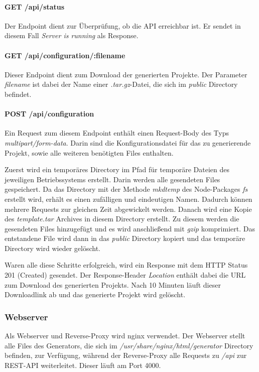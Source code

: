 \paragraph{GET /api/status}
Der Endpoint dient zur Überprüfung, ob die API erreichbar ist.
Er sendet in diesem Fall \textit{Server is running} als Response.

\paragraph{GET /api/configuration/:filename}
Dieser Endpoint dient zum Download der generierten Projekte.
Der Parameter \textit{filename} ist dabei der Name einer \textit{.tar.gz}-Datei, die sich im \textit{public}
Directory befindet.

\paragraph{POST /api/configuration}
Ein Request zum diesem Endpoint enthält einen Request-Body des Typs
\textit{multipart/form-data}.
Darin sind die Konfigurationsdatei für das zu generierende Projekt, sowie alle weiteren benötigten Files enthalten.

Zuerst wird ein temporäres Directory im Pfad für temporäre Dateien des jeweiligen Betriebssystems erstellt.
Darin werden alle gesendeten Files gespeichert.
Da das Directory mit der Methode \textit{mkdtemp} des Node-Packages \textit{fs} erstellt wird, erhält es einen
zufälligen und eindeutigen Namen.
Dadurch können mehrere Requests zur gleichen Zeit abgewickelt werden.
Danach wird eine Kopie des \textit{template.tar} Archives in diesem Directory erstellt.
Zu diesem werden die gesendeten Files hinzugefügt und es wird anschließend mit \textit{gzip} komprimiert.
Das entstandene File wird dann in das \textit{public} Directory kopiert und das temporäre Directory wird wieder gelöscht.

Waren alle diese Schritte erfolgreich, wird ein Response mit dem HTTP Status 201 (Created)
gesendet.
Der Response-Header \textit{Location} enthält dabei die URL zum Download des generierten Projekts.
Nach 10 Minuten läuft dieser Downloadlink ab und das generierte Projekt wird gelöscht.

\subsubsection{Webserver}
Als Webserver und Reverse-Proxy wird nginx verwendet.
Der Webserver stellt alle Files des Generators, die sich im \textit{/usr/share/nginx/html/generator} Directory
befinden, zur Verfügung, während der Reverse-Proxy alle Requests zu \textit{/api} zur REST-API weiterleitet.
Dieser läuft am Port 4000.

